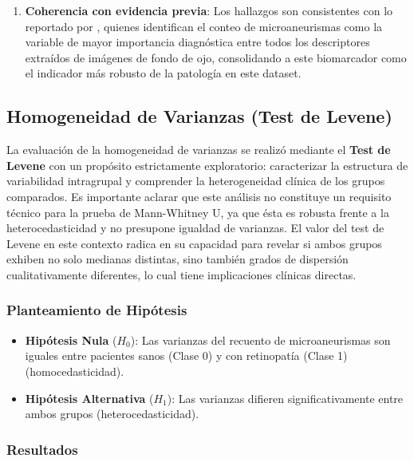 \begin{enumerate}
    \item \textbf{Coherencia con evidencia previa}: Los hallazgos son consistentes
    con lo reportado por \textcite{casanova2014application}, quienes identifican el
    conteo de microaneurismas como la variable de mayor importancia diagnóstica entre
    todos los descriptores extraídos de imágenes de fondo de ojo, consolidando a este
    biomarcador como el indicador más robusto de la patología en este dataset.
\end{enumerate}

\subsection{Homogeneidad de Varianzas (Test de Levene)}

La evaluación de la homogeneidad de varianzas se realizó mediante el \textbf{Test de
Levene} con un propósito estrictamente exploratorio: caracterizar la estructura de
variabilidad intragrupal y comprender la heterogeneidad clínica de los grupos comparados.
Es importante aclarar que este análisis no constituye un requisito técnico para la prueba
de Mann-Whitney U, ya que ésta es robusta frente a la heterocedasticidad y no presupone
igualdad de varianzas. El valor del test de Levene en este contexto radica en su capacidad
para revelar si ambos grupos exhiben no solo medianas distintas, sino también grados de
dispersión cualitativamente diferentes, lo cual tiene implicaciones clínicas directas.

\subsubsection{Planteamiento de Hipótesis}

\begin{itemize}
    \item \textbf{Hipótesis Nula} ($H_{0}$): Las varianzas del recuento de microaneurismas
    son iguales entre pacientes sanos (Clase 0) y con retinopatía (Clase 1)
    (homocedasticidad).
    \item \textbf{Hipótesis Alternativa} ($H_{1}$): Las varianzas difieren
    significativamente entre ambos grupos (heterocedasticidad).
\end{itemize}

\subsubsection{Resultados}

